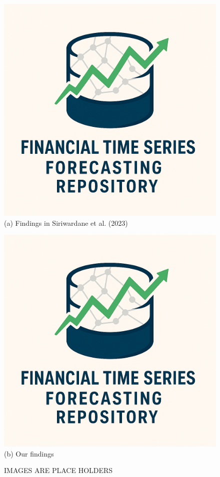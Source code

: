 \documentclass{article}
\begin{document}
\begin{figure}[htbp]
  \centering
  \begin{minipage}[b]{0.48\textwidth}
    \centering
    \includegraphics[width=\linewidth]{logo.png}
    \\[1ex] %
    {\small (a) Findings in Siriwardane et al. (2023)}
  \end{minipage}
  \hfill
  \begin{minipage}[b]{0.48\textwidth}
    \centering
    \includegraphics[width=\linewidth]{logo.png}
    \\[1ex]
    {\small (b) Our findings}
  \end{minipage}
  \caption{IMAGES ARE PLACE HOLDERS}
  \label{fig:comparison-minipage}
\end{figure}
\end{document}
